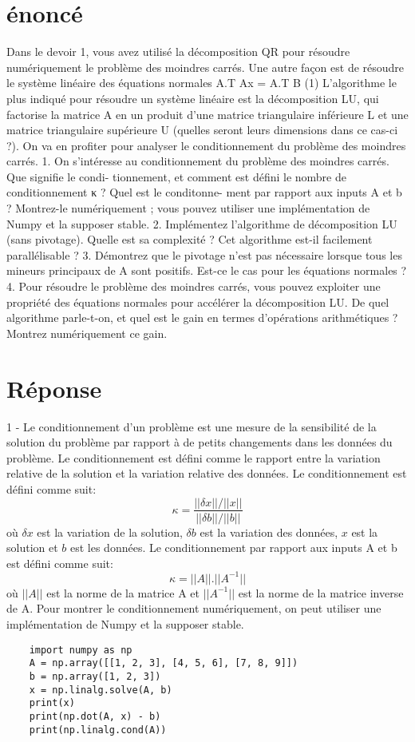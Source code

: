 \section{énoncé}
Dans le devoir 1, vous avez utilisé la décomposition QR pour résoudre numériquement le problème
des moindres carrés. Une autre façon est de résoudre le système linéaire des équations normales
A.T Ax = A.T B (1)
L’algorithme le plus indiqué pour résoudre un système linéaire est la décomposition LU, qui factorise
la matrice A en un produit d’une matrice triangulaire inférieure L et une matrice triangulaire
supérieure U (quelles seront leurs dimensions dans ce cas-ci ?). On va en profiter pour analyser le
conditionnement du problème des moindres carrés.
1. On s’intéresse au conditionnement du problème des moindres carrés. Que signifie le condi-
tionnement, et comment est défini le nombre de conditionnement κ ? Quel est le conditonne-
ment par rapport aux inputs A et b ? Montrez-le numériquement ; vous pouvez utiliser une
implémentation de Numpy et la supposer stable.
2. Implémentez l’algorithme de décomposition LU (sans pivotage). Quelle est sa complexité ?
Cet algorithme est-il facilement parallélisable ?
3. Démontrez que le pivotage n’est pas nécessaire lorsque tous les mineurs principaux de A
sont positifs. Est-ce le cas pour les équations normales ?
4. Pour résoudre le problème des moindres carrés, vous pouvez exploiter une propriété des
équations normales pour accélérer la décomposition LU. De quel algorithme parle-t-on, et
quel est le gain en termes d’opérations arithmétiques ? Montrez numériquement ce gain.

\section{Réponse}
1 - Le conditionnement d'un problème est une mesure de la sensibilité de la solution du problème par rapport à de petits 
changements dans les données du problème. Le conditionnement est défini comme le rapport entre la variation relative de la solution et
 la variation relative des données. Le conditionnement est défini comme suit: 
\begin{equation}
    \kappa = \frac{||\delta x||/||x||}{||\delta b||/||b||}
\end{equation}
où $\delta x$ est la variation de la solution, $\delta b$ est la variation des données, $x$ est la solution et $b$ est les données.
Le conditionnement par rapport aux inputs A et b est défini comme suit:
\begin{equation}
    \kappa = ||A||.||A^{-1}||
\end{equation}
où $||A||$ est la norme de la matrice A et $||A^{-1}||$ est la norme de la matrice inverse de A.
Pour montrer le conditionnement numériquement, on peut utiliser une implémentation de Numpy et la supposer stable.
\begin{lstlisting}
    import numpy as np
    A = np.array([[1, 2, 3], [4, 5, 6], [7, 8, 9]])
    b = np.array([1, 2, 3])
    x = np.linalg.solve(A, b)
    print(x)
    print(np.dot(A, x) - b)
    print(np.linalg.cond(A))
\end{lstlisting}



